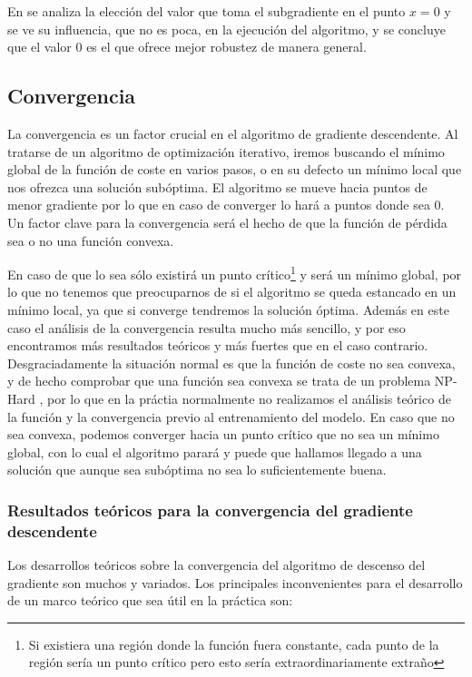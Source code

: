 En \cite{ReLuat0} se analiza la elección del valor que toma el subgradiente en el punto $x=0$ y se ve su influencia, que no es poca, en la ejecución del algoritmo, y se concluye que el valor 0 es el que ofrece mejor robustez de manera general.




\subsection{Convergencia} \label{sec:convergencia}

La convergencia es un factor crucial en el algoritmo de gradiente descendente. Al tratarse de un algoritmo de optimización iterativo, iremos buscando el mínimo global de la función de coste en varios pasos, o en su defecto un mínimo local que nos ofrezca una solución subóptima. El algoritmo se mueve hacia puntos de menor gradiente por lo que en caso de converger lo hará a puntos donde sea 0. Un factor clave para la convergencia será el hecho de que la función de pérdida sea o no una función convexa.

En caso de que lo sea sólo existirá un punto crítico\footnote{Si existiera una región donde la función fuera constante, cada punto de la región sería un punto crítico pero esto sería extraordinariamente extraño} y será un mínimo global, por lo que no tenemos que preocuparnos de si el algoritmo se queda estancado en un mínimo local, ya que si converge tendremos la solución óptima. Además en este caso el análisis de la convergencia resulta mucho más sencillo, y por eso encontramos más resultados teóricos y más fuertes que en el caso contrario. Desgraciadamente la situación normal es que la función de coste no sea convexa, y de hecho comprobar que una función sea convexa se trata de un problema NP-Hard \cite{Ahmadi_2011_NP_Convex}, por lo que en la práctia normalmente no realizamos el análisis teórico de la función y la convergencia previo al entrenamiento del modelo. En caso que no sea convexa, podemos converger hacia un punto crítico que no sea un mínimo global, con lo cual el algoritmo parará y puede que hallamos llegado a una solución que aunque sea subóptima no sea lo suficientemente buena.


\subsubsection{Resultados teóricos para la convergencia del gradiente descendente}

Los desarrollos teóricos sobre la convergencia del algoritmo de descenso del gradiente son muchos y variados. Los principales inconvenientes para el desarrollo de un marco teórico que sea útil en la práctica son:

